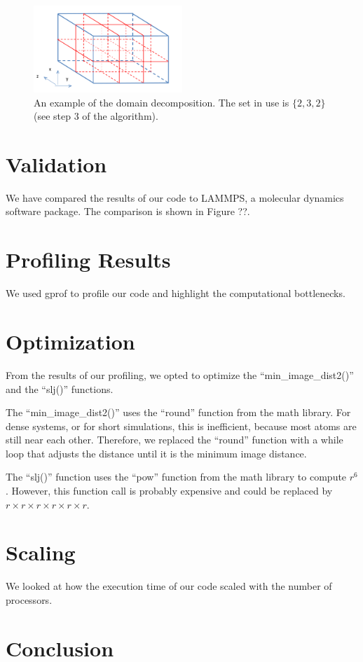 \documentclass[10pt]{article}
\begin{document}
\begin{figure}[htb]
\includegraphics[width=0.5\textwidth]{ddecomp.jpg}
\caption{An example of the domain decomposition. The set in use is $\{2,3,2\}$ (see step 3 of the algorithm).}
\label{fig:ddecomp}
\end{figure}

\section{Validation}
We have compared the results of our code to LAMMPS, a molecular dynamics software package.
%
The comparison is shown in Figure ??.

\section{Profiling Results}
We used gprof to profile our code and highlight the computational bottlenecks.

\section{Optimization}
From the results of our profiling, we opted to optimize the ``min\_image\_dist2()'' and the ``slj()'' functions.

The ``min\_image\_dist2()'' uses the ``round'' function from the math library. 
%
For dense systems, or for short simulations, this is inefficient, because most atoms are still near each other.
%
Therefore, we replaced the ``round'' function with a while loop that adjusts the distance until it is the minimum image distance.

The ``slj()'' function uses the ``pow'' function from the math library to compute $r^6$.
%
However, this function call is probably expensive and could be replaced by $r \times r \times r \times r \times r \times r$.
%

\section{Scaling}
We looked at how the execution time of our code scaled with the number of processors.

\section{Conclusion}
\end{document}
